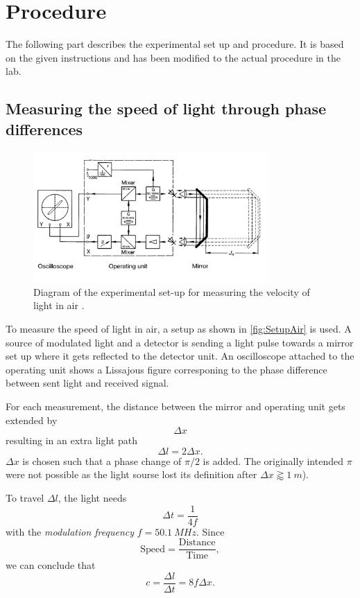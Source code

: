 \section{Procedure}
\label{sec:procedure}
The following part describes the experimental set up and procedure. It is based on the given
instructions and has been modified to the actual procedure in the lab.

\subsection{Measuring the speed of light through phase differences}
\label{sec:measuring}
\begin{figure}
    \centering
    \includegraphics[width=0.8\textwidth]{media/Setup Air.png}
    \caption{Diagram of the experimental set-up for measuring the velocity of light in air
              \cite{LabInstructions}.}
    \label{fig:SetupAir}
\end{figure}
To measure the speed of light in air, a setup as shown in \autoref{fig:SetupAir} is used. A source
of modulated light and a detector is sending a light pulse towards a mirror set up where it gets
reflected to the detector unit. An oscilloscope attached to the operating unit shows a Lissajous
figure corresponing to the phase difference between sent light and received signal.

For each measurement, the distance between the mirror and operating unit gets extended by
\[
\Delta x
\]
resulting in an extra light path
\[
  \Delta l = 2 \Delta x.
\]
$\Delta x$ is chosen such that a phase change of $\pi / 2$ is added. The originally intended $\pi$
were not possible as the light sourse lost its definition after $\Delta x \gtrapprox \SI{1}{m}$).

To travel $\Delta l$, the light needs 
\[
  \Delta t = \frac{1}{4f}
\]
with the \textit{modulation frequency} $f = \SI{50.1}{MHz}$. Since
\[
  \text{Speed} = \frac{\text{Distance}}{\text{Time}},
\]
we can conclude that
\begin{equation}
  c = \frac{\Delta l}{\Delta t} = 8f \Delta x.
  \label{eqn:speedoflight}
\end{equation}


